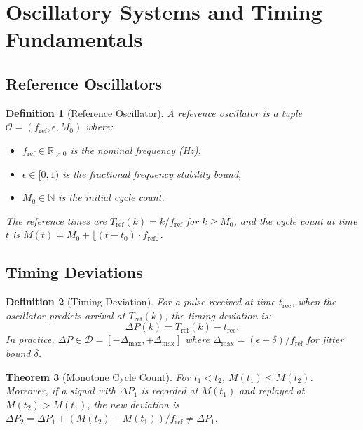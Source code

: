 \documentclass[twocolumn,11pt,a4paper]{article}
\newtheorem{theorem}{Theorem}[section]
\newtheorem{definition}[theorem]{Definition}
\newcommand{\DP}{\Delta P}
\newcommand{\calD}{\mathcal{D}}
\newcommand{\Tref}{T_{\mathrm{ref}}}
\newcommand{\trec}{t_{\mathrm{rec}}}
\newcommand{\fref}{f_{\mathrm{ref}}}
\newcommand{\Mcyc}{M}
\begin{document}
\section{Oscillatory Systems and Timing Fundamentals}
\label{sec:oscillator}

\subsection{Reference Oscillators}

\begin{definition}[Reference Oscillator]
A \emph{reference oscillator} is a tuple $\mathcal{O} = (\fref, \epsilon, M_0)$ where:
\begin{itemize}[nosep,leftmargin=1em]
  \item $\fref \in \mathbb{R}_{>0}$ is the nominal frequency (Hz),
  \item $\epsilon \in [0,1)$ is the fractional frequency stability bound,
  \item $M_0 \in \mathbb{N}$ is the initial cycle count.
\end{itemize}
The reference times are $\Tref(k) = k/\fref$ for $k \geq M_0$, and the cycle count at time $t$ is $\Mcyc(t) = M_0 + \lfloor (t - t_0) \cdot \fref \rfloor$.
\end{definition}

\subsection{Timing Deviations}

\begin{definition}[Timing Deviation]
For a pulse received at time $\trec$, when the oscillator predicts arrival at $\Tref(k)$, the \emph{timing deviation} is:
\begin{equation}
  \DP(k) = \Tref(k) - \trec.
  \label{eq:dp-def}
\end{equation}
In practice, $\DP \in \calD = [-\Delta_{\max}, +\Delta_{\max}]$ where $\Delta_{\max} = (\epsilon + \delta)/\fref$ for jitter bound $\delta$.
\end{definition}

\begin{theorem}[Monotone Cycle Count]
For $t_1 < t_2$, $\Mcyc(t_1) \leq \Mcyc(t_2)$. Moreover, if a signal with $\DP_1$ is recorded at $\Mcyc(t_1)$ and replayed at $\Mcyc(t_2) > \Mcyc(t_1)$, the new deviation is $\DP_2 = \DP_1 + (\Mcyc(t_2) - \Mcyc(t_1))/\fref \neq \DP_1$.
\end{theorem}
\end{document}
